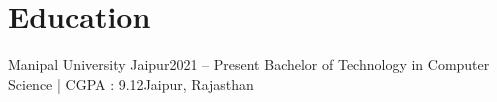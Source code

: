\section{Education}
  \resumeSubHeadingListStart
    \resumeSubheading
      {Manipal University Jaipur}{2021 -- Present}
      {Bachelor of Technology in Computer Science | CGPA : 9.12}{Jaipur, Rajasthan }
  \resumeSubHeadingListEnd
  \vspace{-10pt}

